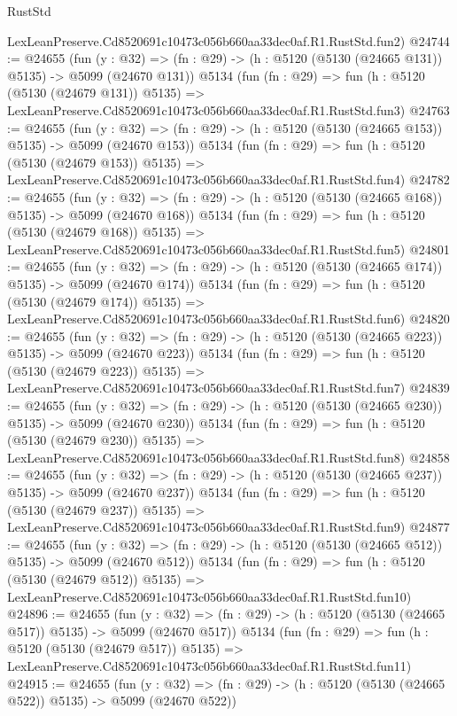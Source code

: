 \begin{lexlean}{RustStd}
\begin{coremodule}
    LexLeanPreserve.Cd8520691c10473c056b660aa33dec0af.R1.RustStd.fun2)
@24744 := @24655
    (fun (y : @32) => (fn : @29) -> (h : @5120 (@5130 (@24665 @131)) @5135) -> @5099 (@24670 @131))
    @5134
    (fun (fn : @29) =>
    fun (h : @5120 (@5130 (@24679 @131)) @5135) =>
    LexLeanPreserve.Cd8520691c10473c056b660aa33dec0af.R1.RustStd.fun3)
@24763 := @24655
    (fun (y : @32) => (fn : @29) -> (h : @5120 (@5130 (@24665 @153)) @5135) -> @5099 (@24670 @153))
    @5134
    (fun (fn : @29) =>
    fun (h : @5120 (@5130 (@24679 @153)) @5135) =>
    LexLeanPreserve.Cd8520691c10473c056b660aa33dec0af.R1.RustStd.fun4)
@24782 := @24655
    (fun (y : @32) => (fn : @29) -> (h : @5120 (@5130 (@24665 @168)) @5135) -> @5099 (@24670 @168))
    @5134
    (fun (fn : @29) =>
    fun (h : @5120 (@5130 (@24679 @168)) @5135) =>
    LexLeanPreserve.Cd8520691c10473c056b660aa33dec0af.R1.RustStd.fun5)
@24801 := @24655
    (fun (y : @32) => (fn : @29) -> (h : @5120 (@5130 (@24665 @174)) @5135) -> @5099 (@24670 @174))
    @5134
    (fun (fn : @29) =>
    fun (h : @5120 (@5130 (@24679 @174)) @5135) =>
    LexLeanPreserve.Cd8520691c10473c056b660aa33dec0af.R1.RustStd.fun6)
@24820 := @24655
    (fun (y : @32) => (fn : @29) -> (h : @5120 (@5130 (@24665 @223)) @5135) -> @5099 (@24670 @223))
    @5134
    (fun (fn : @29) =>
    fun (h : @5120 (@5130 (@24679 @223)) @5135) =>
    LexLeanPreserve.Cd8520691c10473c056b660aa33dec0af.R1.RustStd.fun7)
@24839 := @24655
    (fun (y : @32) => (fn : @29) -> (h : @5120 (@5130 (@24665 @230)) @5135) -> @5099 (@24670 @230))
    @5134
    (fun (fn : @29) =>
    fun (h : @5120 (@5130 (@24679 @230)) @5135) =>
    LexLeanPreserve.Cd8520691c10473c056b660aa33dec0af.R1.RustStd.fun8)
@24858 := @24655
    (fun (y : @32) => (fn : @29) -> (h : @5120 (@5130 (@24665 @237)) @5135) -> @5099 (@24670 @237))
    @5134
    (fun (fn : @29) =>
    fun (h : @5120 (@5130 (@24679 @237)) @5135) =>
    LexLeanPreserve.Cd8520691c10473c056b660aa33dec0af.R1.RustStd.fun9)
@24877 := @24655
    (fun (y : @32) => (fn : @29) -> (h : @5120 (@5130 (@24665 @512)) @5135) -> @5099 (@24670 @512))
    @5134
    (fun (fn : @29) =>
    fun (h : @5120 (@5130 (@24679 @512)) @5135) =>
    LexLeanPreserve.Cd8520691c10473c056b660aa33dec0af.R1.RustStd.fun10)
@24896 := @24655
    (fun (y : @32) => (fn : @29) -> (h : @5120 (@5130 (@24665 @517)) @5135) -> @5099 (@24670 @517))
    @5134
    (fun (fn : @29) =>
    fun (h : @5120 (@5130 (@24679 @517)) @5135) =>
    LexLeanPreserve.Cd8520691c10473c056b660aa33dec0af.R1.RustStd.fun11)
@24915 := @24655
    (fun (y : @32) => (fn : @29) -> (h : @5120 (@5130 (@24665 @522)) @5135) -> @5099 (@24670 @522))

\end{coremodule}
\end{lexlean}
